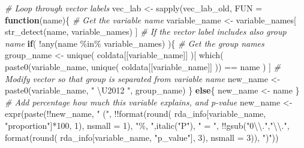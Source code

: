 \documentclass[
]{book}
\newenvironment{Shaded}{\begin{snugshade}}{\end{snugshade}}
\newcommand{\AttributeTok}[1]{\textcolor[rgb]{0.77,0.63,0.00}{#1}}
\newcommand{\CommentTok}[1]{\textcolor[rgb]{0.56,0.35,0.01}{\textit{#1}}}
\newcommand{\ControlFlowTok}[1]{\textcolor[rgb]{0.13,0.29,0.53}{\textbf{#1}}}
\newcommand{\DecValTok}[1]{\textcolor[rgb]{0.00,0.00,0.81}{#1}}
\newcommand{\FunctionTok}[1]{\textcolor[rgb]{0.00,0.00,0.00}{#1}}
\newcommand{\NormalTok}[1]{#1}
\newcommand{\OtherTok}[1]{\textcolor[rgb]{0.56,0.35,0.01}{#1}}
\newcommand{\SpecialCharTok}[1]{\textcolor[rgb]{0.00,0.00,0.00}{#1}}
\newcommand{\StringTok}[1]{\textcolor[rgb]{0.31,0.60,0.02}{#1}}
\begin{document}
\begin{Shaded}
\begin{Highlighting}[]
\CommentTok{\# Loop through vector labels}
\NormalTok{vec\_lab }\OtherTok{\textless{}{-}} \FunctionTok{sapply}\NormalTok{(vec\_lab\_old, }\AttributeTok{FUN =} \ControlFlowTok{function}\NormalTok{(name)\{}
    \CommentTok{\# Get the variable name}
\NormalTok{    variable\_name }\OtherTok{\textless{}{-}}\NormalTok{ variable\_names[ }\FunctionTok{str\_detect}\NormalTok{(name, variable\_names) ]}
    \CommentTok{\# If the vector label includes also group name}
    \ControlFlowTok{if}\NormalTok{( }\SpecialCharTok{!}\FunctionTok{any}\NormalTok{(name }\SpecialCharTok{\%in\%}\NormalTok{ variable\_names) )\{}
        \CommentTok{\# Get the group names}
\NormalTok{        group\_name }\OtherTok{\textless{}{-}} \FunctionTok{unique}\NormalTok{( coldata[[variable\_name]] )[ }
        \FunctionTok{which}\NormalTok{( }\FunctionTok{paste0}\NormalTok{(variable\_name, }\FunctionTok{unique}\NormalTok{( coldata[[variable\_name]] )) }\SpecialCharTok{==}\NormalTok{ name ) ]}
        \CommentTok{\# Modify vector so that group is separated from variable name}
\NormalTok{        new\_name }\OtherTok{\textless{}{-}} \FunctionTok{paste0}\NormalTok{(variable\_name, }\StringTok{" \textbackslash{}U2012 "}\NormalTok{, group\_name)}
\NormalTok{    \} }\ControlFlowTok{else}\NormalTok{\{}
\NormalTok{        new\_name }\OtherTok{\textless{}{-}}\NormalTok{ name}
\NormalTok{    \}}
    \CommentTok{\# Add percentage how much this variable explains, and p{-}value}
\NormalTok{    new\_name }\OtherTok{\textless{}{-}} \FunctionTok{expr}\NormalTok{(}\FunctionTok{paste}\NormalTok{(}\SpecialCharTok{!!}\NormalTok{new\_name, }\StringTok{" ("}\NormalTok{, }
                           \SpecialCharTok{!!}\FunctionTok{format}\NormalTok{(}\FunctionTok{round}\NormalTok{( rda\_info[variable\_name, }\StringTok{"proportion"}\NormalTok{]}\SpecialCharTok{*}\DecValTok{100}\NormalTok{, }\DecValTok{1}\NormalTok{), }\AttributeTok{nsmall =} \DecValTok{1}\NormalTok{), }
                           \StringTok{"\%, "}\NormalTok{,}\FunctionTok{italic}\NormalTok{(}\StringTok{"P"}\NormalTok{), }\StringTok{" = "}\NormalTok{, }
                           \SpecialCharTok{!!}\FunctionTok{gsub}\NormalTok{(}\StringTok{"0}\SpecialCharTok{\textbackslash{}\textbackslash{}}\StringTok{."}\NormalTok{,}\StringTok{"}\SpecialCharTok{\textbackslash{}\textbackslash{}}\StringTok{."}\NormalTok{, }\FunctionTok{format}\NormalTok{(}\FunctionTok{round}\NormalTok{( rda\_info[variable\_name, }\StringTok{"p\_value"}\NormalTok{], }\DecValTok{3}\NormalTok{), }
                                                       \AttributeTok{nsmall =} \DecValTok{3}\NormalTok{)), }\StringTok{")"}\NormalTok{))}


\end{Highlighting}
\end{Shaded}
\end{document}
